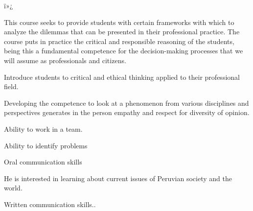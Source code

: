 ï»¿\begin{syllabus}


\begin{justification}
This course seeks to provide students with certain frameworks with which to analyze the dilemmas that can be presented in their professional practice. The course puts in practice the critical and responsible reasoning of the students, being this a fundamental competence for the decision-making processes that we will assume as professionals and citizens.
\end{justification}

\begin{goals}
\item Introduce students to critical and ethical thinking applied to their professional field.
\item Developing the competence to look at a phenomenon from various disciplines and perspectives generates in the person empathy and respect for diversity of opinion.
\item Ability to work in a team.
\item Ability to identify problems
\item Oral communication skills
\item He is interested in learning about current issues of Peruvian society and the world.
\item Written communication skills..
\end{goals}


\begin{outcomes}
    \item {}
    \item {}
    \item {}
    \item {}
    \item {}
\end{outcomes}

\begin{competences}
    \item {}
    \item {}
    \item {}
    \item {}
\end{competences}



\end{syllabus}
